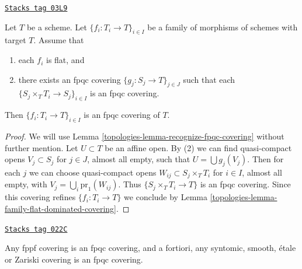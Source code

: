 \begin{lemma}
\label{topologies-lemma-family-flat-fpqc-local-covering}
\href{https://stacks.math.columbia.edu/tag/03L9}{\texttt{Stacks tag 03L9}}

Let $T$ be a scheme. Let $\{f_i : T_i \to T\}_{i \in I}$ be a family of
morphisms of schemes with target $T$. Assume that
\begin{enumerate}
\item each $f_i$ is flat, and
\item there exists an fpqc covering
$\{g_j : S_j \to T\}_{j \in J}$ such that each
$\{S_j \times_T T_i \to S_j\}_{i \in I}$ is an fpqc covering.
\end{enumerate}
Then $\{f_i : T_i \to T\}_{i \in I}$ is an fpqc covering of $T$.
\end{lemma}

\begin{proof}

We will use Lemma \ref{topologies-lemma-recognize-fpqc-covering} without further
mention. Let $U \subset T$ be an affine open. By (2) we can find
quasi-compact opens $V_j \subset S_j$ for $j \in J$, almost all empty, such that
$U = \bigcup g_j(V_j)$. Then for each $j$ we can choose quasi-compact
opens $W_{ij} \subset S_j \times_T T_i$ for $i \in I$, almost all empty,
with $V_j = \bigcup_i \text{pr}_1(W_{ij})$. Thus
$\{S_j \times_T T_i \to T\}$ is an fpqc covering.
Since this covering refines $\{f_i : T_i \to T\}$ we conclude by
Lemma \ref{topologies-lemma-family-flat-dominated-covering}.
\end{proof}

\begin{lemma}
\label{topologies-lemma-zariski-etale-smooth-syntomic-fppf-fpqc}
\href{https://stacks.math.columbia.edu/tag/022C}{\texttt{Stacks tag 022C}}

Any fppf covering is an fpqc covering, and a fortiori,
any syntomic, smooth, \'etale or Zariski covering is an fpqc covering.
\end{lemma}

